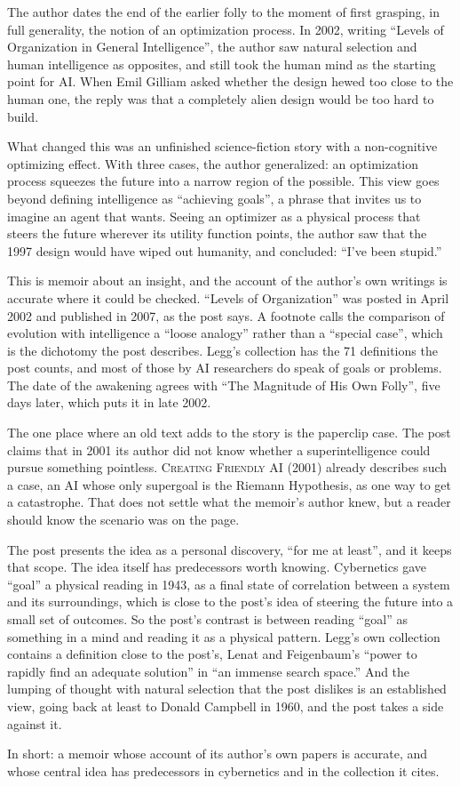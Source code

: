 \begin{afterword}
\summaryhead

The author dates the end of the earlier folly to the moment of first grasping, in full generality, the notion of an optimization process. In 2002, writing ``Levels of Organization in General Intelligence'', the author saw natural selection and human intelligence as opposites, and still took the human mind as the starting point for AI. When Emil Gilliam asked whether the design hewed too close to the human one, the reply was that a completely alien design would be too hard to build.

What changed this was an unfinished science-fiction story with a non-cognitive optimizing effect. With three cases, the author generalized: an optimization process squeezes the future into a narrow region of the possible. This view goes beyond defining intelligence as ``achieving goals'', a phrase that invites us to imagine an agent that wants. Seeing an optimizer as a physical process that steers the future wherever its utility function points, the author saw that the 1997 design would have wiped out humanity, and concluded: ``I've been stupid.''

\responsehead

This is memoir about an insight, and the account of the author's own writings is accurate where it could be checked. ``Levels of Organization'' was posted in April 2002 and published in 2007, as the post says. A footnote calls the comparison of evolution with intelligence a ``loose analogy'' rather than a ``special case'', which is the dichotomy the post describes. Legg's collection has the 71 definitions the post counts, and most of those by AI researchers do speak of goals or problems. The date of the awakening agrees with ``The Magnitude of His Own Folly'', five days later, which puts it in late 2002.

The one place where an old text adds to the story is the paperclip case. The post claims that in 2001 its author did not know whether a superintelligence could pursue something pointless. \textsc{Creating Friendly AI} (2001) already describes such a case, an AI whose only supergoal is the Riemann Hypothesis, as one way to get a catastrophe. That does not settle what the memoir's author knew, but a reader should know the scenario was on the page.

The post presents the idea as a personal discovery, ``for me at least'', and it keeps that scope. The idea itself has predecessors worth knowing. Cybernetics gave ``goal'' a physical reading in 1943, as a final state of correlation between a system and its surroundings, which is close to the post's idea of steering the future into a small set of outcomes. So the post's contrast is between reading ``goal'' as something in a mind and reading it as a physical pattern. Legg's own collection contains a definition close to the post's, Lenat and Feigenbaum's ``power to rapidly find an adequate solution'' in ``an immense search space.'' And the lumping of thought with natural selection that the post dislikes is an established view, going back at least to Donald Campbell in 1960, and the post takes a side against it.

In short: a memoir whose account of its author's own papers is accurate, and whose central idea has predecessors in cybernetics and in the collection it cites.
\end{afterword}
